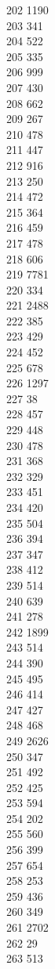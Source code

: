 { 202	1190 \\
 203	341 \\
 204	522 \\
 205	335 \\
 206	999 \\
 207	430 \\
 208	662 \\
 209	267 \\
 210	478 \\
 211	447 \\
 212	916 \\
 213	250 \\
 214	472 \\
 215	364 \\
 216	459 \\
 217	478 \\
 218	606 \\
 219	7781 \\
 220	334 \\
 221	2488 \\
 222	385 \\
 223	429 \\
 224	452 \\
 225	678 \\
 226	1297 \\
 227	38 \\
 228	457 \\
 229	448 \\
 230	478 \\
 231	368 \\
 232	329 \\
 233	451 \\
 234	420 \\
 235	504 \\
 236	394 \\
 237	347 \\
 238	412 \\
 239	514 \\
 240	639 \\
 241	278 \\
 242	1899 \\
 243	514 \\
 244	390 \\
 245	495 \\
 246	414 \\
 247	427 \\
 248	468 \\
 249	2626 \\
 250	347 \\
 251	492 \\
 252	425 \\
 253	594 \\
 254	202 \\
 255	560 \\
 256	399 \\
 257	654 \\
 258	253 \\
 259	436 \\
 260	349 \\
 261	2702 \\
 262	29 \\
 263	513 \\
}

